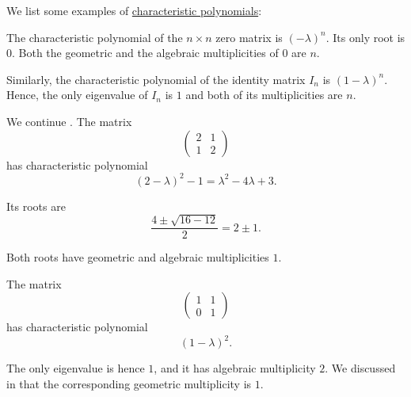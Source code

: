 \begin{example}\label{ex:def:characteristic_polynomial}
  We list some examples of \hyperref[def:characteristic_polynomial]{characteristic polynomials}:
  \begin{thmenum}
     The characteristic polynomial of the \( n \times n \) zero matrix is \( (-\lambda)^n \). Its only root is \( 0 \). Both the geometric and the algebraic multiplicities of \( 0 \) are \( n \).

     Similarly, the characteristic polynomial of the identity matrix \( I_n \) is \( (1 - \lambda)^n \). Hence, the only eigenvalue of \( I_n \) is \( 1 \) and both of its multiplicities are \( n \).

     We continue . The matrix
    \begin{equation*}
      \begin{pmatrix}
        2 & 1 \\
        1 & 2
      \end{pmatrix}
    \end{equation*}
    has characteristic polynomial
    \begin{equation*}
      (2 - \lambda)^2 - 1 = \lambda^2 - 4\lambda + 3.
    \end{equation*}

    Its roots are
    \begin{equation*}
      \frac {4 \pm \sqrt{16 - 12}} 2 = 2 \pm 1.
    \end{equation*}

    Both roots have geometric and algebraic multiplicities \( 1 \).

     The matrix
    \begin{equation*}
      \begin{pmatrix}
        1 & 1 \\
        0 & 1
      \end{pmatrix}
    \end{equation*}
    has characteristic polynomial
    \begin{equation*}
      (1 - \lambda)^2.
    \end{equation*}

    The only eigenvalue is hence \( 1 \), and it has algebraic multiplicity \( 2 \). We discussed in  that the corresponding geometric multiplicity is \( 1 \).
  \end{thmenum}
\end{example}

